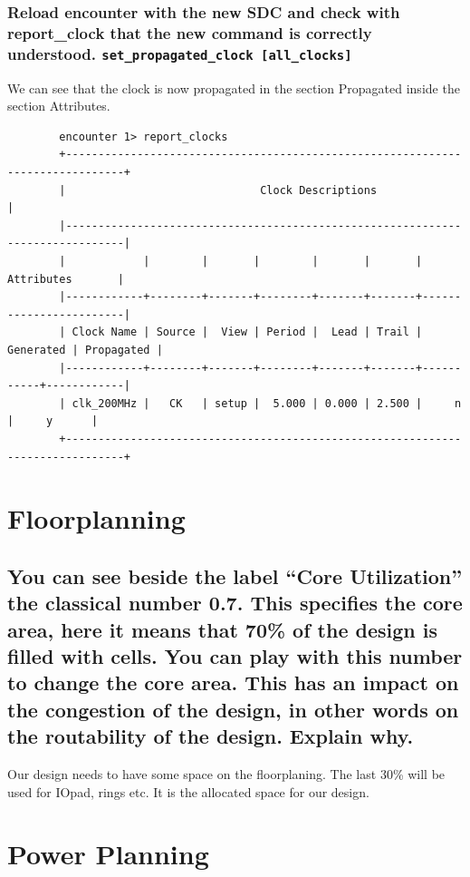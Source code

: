 \documentclass[11pt,a4paper,sans,dvipsnames]{report}
\begin{document}
	\subsubsection*{Reload encounter with the new SDC and check with report\_clock that the new command is
		correctly understood. \texttt{set\_propagated\_clock [all\_clocks]}}

	We can see that the clock is now propagated in the section Propagated inside the section Attributes.

	\begin{lstlisting}
		encounter 1> report_clocks
		+-------------------------------------------------------------------------------+ 
		|                              Clock Descriptions                               | 
		|-------------------------------------------------------------------------------| 
		|            |        |       |        |       |       |       Attributes       | 
		|------------+--------+-------+--------+-------+-------+------------------------| 
		| Clock Name | Source |  View | Period |  Lead | Trail | Generated | Propagated | 
		|------------+--------+-------+--------+-------+-------+-----------+------------| 
		| clk_200MHz |   CK   | setup |  5.000 | 0.000 | 2.500 |     n     |     y      | 
		+-------------------------------------------------------------------------------+ 
	\end{lstlisting}

	\newpage
	\section{Floorplanning}

	\subsection*{You can see beside the label “Core Utilization” the classical number 0.7. This specifies the core
		area, here it means that 70\% of the design is filled with cells. You can play with this number to
		change the core area. This has an impact on the congestion of the design, in other words on the
		routability of the design. Explain why.}

	Our design needs to have some space on the floorplaning. The last 30\% will be used for IOpad, rings etc. It is the allocated space for our design.

	\section{Power Planning}
\end{document}
